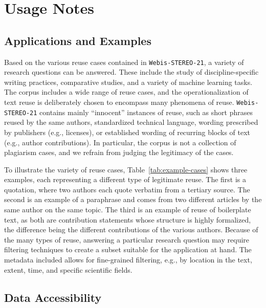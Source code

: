 \documentclass[fleqn,10pt]{wlscirep}
\newcommand{\webisReuseCorpus}{\texttt{Webis-STEREO-21}\xspace}
\begin{document}
\section*{Usage Notes}


\subsection*{Applications and Examples}

Based on the various reuse cases contained in \webisReuseCorpus, a variety of research questions can be answered. These include the study of discipline-specific writing practices, comparative studies, and a variety of machine learning tasks. The corpus includes a wide range of reuse cases, and the operationalization of text reuse is deliberately chosen to encompass many phenomena of reuse. \webisReuseCorpus contains mainly ``innocent'' instances of reuse, such as short phrases reused by the same authors, standardized technical language, wording prescribed by publishers (e.g., licenses), or established wording of recurring blocks of text (e.g., author contributions). In particular, the corpus is not a collection of plagiarism cases, and we refrain from judging the legitimacy of the cases. 

To illustrate the variety of reuse cases, Table~\ref{tab:example-cases} shows three examples, each representing a different type of legitimate reuse. The first is a quotation, where two authors each quote verbatim from a tertiary source. The second is an example of a paraphrase and comes from two different articles by the same author on the same topic. The third is an example of reuse of boilerplate text, as both are contribution statements whose structure is highly formalized, the difference being the different contributions of the various authors. Because of the many types of reuse, answering a particular research question may require filtering techniques to create a subset suitable for the application at hand. The metadata included allows for fine-grained filtering, e.g., by location in the text, extent, time, and specific scientific fields. 

\subsection*{Data Accessibility}
\end{document}
